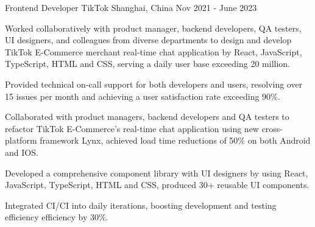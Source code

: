 \linespread{1.2}

\begin{cventries}

  \cventry
    {Frontend Developer} %
    {TikTok} %
    {Shanghai, China} %
    {Nov 2021 - June 2023} %
    {
      \begin{cvitems} %
        \item Worked collaboratively with product manager, backend developers, QA testers, UI designers, and colleagues from diverse departments to design and develop TikTok E-Commerce merchant real-time chat application by React, JavaScript, TypeScript, HTML and CSS, serving a daily user base exceeding 20 million.
        \item Provided technical on-call support for both developers and users, resolving over 15 issues per month and achieving a user satisfaction rate exceeding 90\%.
        \item Collaborated with product managers, backend developers and QA testers to refactor TikTok E-Commerce's real-time chat application using new cross-platform framework Lynx, achieved load time reductions of 50\% on both Android and IOS.
        \item Developed a comprehensive component library with UI designers by using React, JavaScript, TypeScript, HTML and CSS, produced 30+ reusable UI components.
        \item Integrated CI/CI into daily iterations, boosting development and testing efficiency efficiency by 30\%. 
      \end{cvitems}
    }


\end{cventries}
